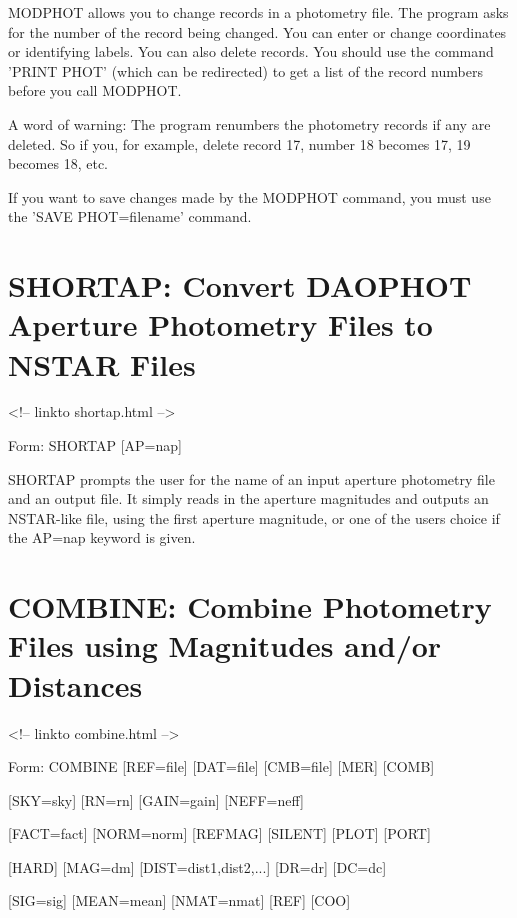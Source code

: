 MODPHOT allows you to change records in a photometry file. The program asks
for the number of the record being changed. You can enter or change
coordinates or identifying labels.  You can also delete records. You should
use the command 'PRINT PHOT' (which can be redirected) to get a list of the
record numbers before you call MODPHOT.

A word of warning: The program renumbers the photometry records if any are
deleted.  So if you, for example, delete record 17, number 18 becomes 17,
19 becomes 18, etc.

If you want to save changes made by the MODPHOT command, you must use the
'SAVE PHOT=filename' command.

\section{SHORTAP: Convert DAOPHOT Aperture Photometry Files to NSTAR Files}
\begin{rawhtml}
<!-- linkto shortap.html -->
\end{rawhtml}
\begin{command}
  \item[Form: SHORTAP {[AP=nap]}\hfill]{}
\end{command}

SHORTAP prompts the user for the name of an input aperture photometry file
and an output file. It simply reads in the aperture magnitudes and outputs
an NSTAR-like file, using the first aperture magnitude, or one of the users
choice if the AP=nap keyword is given.

\section{COMBINE: Combine Photometry Files using Magnitudes and/or 
        Distances}
\begin{rawhtml}
<!-- linkto combine.html -->
\end{rawhtml}
\begin{command}
  \item[Form: COMBINE {[REF=file]} {[DAT=file]} {[CMB=file]} {[MER]} {[COMB]}\hfill]{}
  \item{{[SKY=sky]} {[RN=rn]} {[GAIN=gain]} {[NEFF=neff]}}
  \item{{[FACT=fact]} {[NORM=norm]} {[REFMAG]} {[SILENT]} {[PLOT]} {[PORT]}}
  \item{{[HARD]} {[MAG=dm]} {[DIST=dist1,dist2,...]} {[DR=dr]} {[DC=dc]}}
  \item{{[SIG=sig]} {[MEAN=mean]} {[NMAT=nmat]} {[REF]} {[COO]}}
\end{command}

